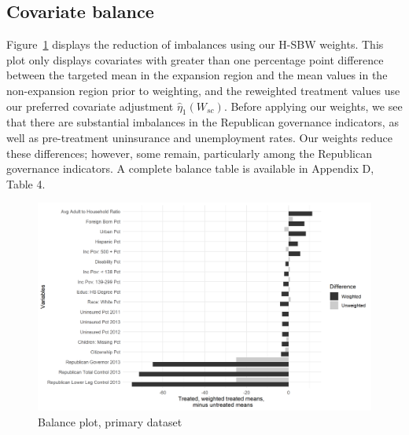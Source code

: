 \documentclass[aoas]{imsart}
\theoremstyle{plain}
\theoremstyle{remark}
\begin{document}
\subsection{Covariate balance}

Figure~\ref{fig:loveplotc1} displays the reduction of imbalances using our H-SBW weights. This plot only displays covariates with greater than one percentage point difference between the targeted mean in the expansion region and the mean values in the non-expansion region prior to weighting, and the reweighted treatment values use our preferred covariate adjustment $\hat{\eta}_1(W_{sc})$. Before applying our weights, we see that there are substantial imbalances in the Republican governance indicators, as well as pre-treatment uninsurance and unemployment rates. Our weights reduce these differences; however, some remain, particularly among the Republican governance indicators. A complete balance table is available in Appendix D, Table 4. 

\begin{figure}[H]
\begin{center}
    \caption{Balance plot, primary dataset}
    \label{fig:loveplotc1}
    \includegraphics[scale=0.5]{01_Plots/balance-plot-etuc1.png}
\end{center}
\end{figure}
\end{document}
